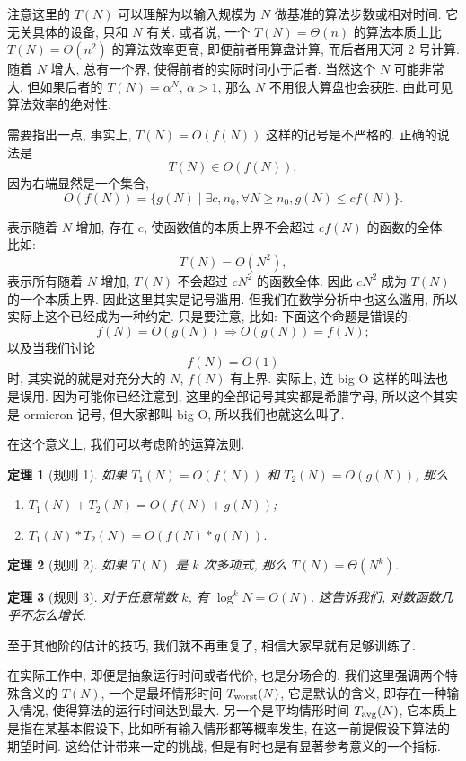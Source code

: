\documentclass[a4paper]{ctexart}
\newtheorem{theorem}{定理}
\theoremstyle{definition}
\theoremstyle{definition}
\begin{document}
注意这里的 $T(N)$ 可以理解为以输入规模为 $N$ 做基准的算法步数或相对时间.
它无关具体的设备, 只和 $N$ 有关. 或者说,
一个 $T(N) = \Theta(n)$ 的算法本质上比 $T(N) = \Theta(n^2)$ 的算法效率更高,
即便前者用算盘计算, 而后者用天河 2 号计算. 随着 $N$ 增大, 总有一个界,
使得前者的实际时间小于后者. 当然这个 $N$ 可能非常大. 但如果后者的
$T(N) = \alpha^N$, $\alpha > 1$, 那么 $N$ 不用很大算盘也会获胜.
由此可见算法效率的绝对性.

需要指出一点, 事实上, $T(N) = O(f(N))$ 这样的记号是不严格的.
正确的说法是
$$
T(N) \in O(f(N)),
$$
因为右端显然是一个集合, 
$$
O(f(N)) = \{ g(N) \mid \exists c, n_0, \forall N \geq n_0, g(N) \leq cf(N) \}.
$$

表示随着 $N$ 增加, 存在 $c$, 使函数值的本质上界不会超过 $c f(N)$ 的函数的全体.
比如:
$$
T(N) = O(N^2),
$$
表示所有随着 $N$ 增加, $T(N)$ 不会超过 $c N^2$ 的函数全体.
因此 $c N^2$ 成为 $T(N)$ 的一个本质上界. 因此这里其实是记号滥用. 
但我们在数学分析中也这么滥用, 所以实际上这个已经成为一种约定. 只是要注意, 比如: 
下面这个命题是错误的:
$$
f(N) = O(g(N)) \Rightarrow O(g(N)) = f(N); 
$$
以及当我们讨论
$$
f(N) = O(1)
$$
时, 其实说的就是对充分大的 $N$, $f(N)$ 有上界. 实际上, 连 big-O 这样的叫法也是误用.
因为可能你已经注意到, 这里的全部记号其实都是希腊字母, 所以这个其实是 ormicron 记号,
但大家都叫 big-O, 所以我们也就这么叫了.

在这个意义上, 我们可以考虑阶的运算法则.

\begin{theorem}[规则 1]
  如果 $T_1(N) = O(f(N))$ 和 $T_2(N) = O(g(N))$, 那么
\begin{enumerate}
\item $T_1(N) + T_2(N) = O(f(N) + g(N))$;
\item $T_1(N) * T_2(N) = O(f(N) * g(N))$.
\end{enumerate}
\end{theorem}

\begin{theorem}[规则 2]
如果 $T(N)$ 是 $k$ 次多项式, 那么 $T(N) = \Theta(N^k)$.  
\end{theorem}

\begin{theorem}[规则 3]
对于任意常数 $k$, 有 $\log^k N = O(N)$.
这告诉我们, 对数函数几乎不怎么增长.
\end{theorem}

至于其他阶的估计的技巧, 我们就不再重复了, 相信大家早就有足够训练了.

在实际工作中, 即便是抽象运行时间或者代价, 也是分场合的. 我们这里强调两个特殊含义的 $T(N)$,
一个是最坏情形时间 $T_{\rm worst} (N)$, 它是默认的含义, 即存在一种输入情况, 使得算法的运行时间达到最大.
另一个是平均情形时间 $T_{\rm avg}(N)$, 它本质上是指在某基本假设下,
比如所有输入情形都等概率发生, 在这一前提假设下算法的期望时间. 这给估计带来一定的挑战,
但是有时也是有显著参考意义的一个指标.
\end{document}
